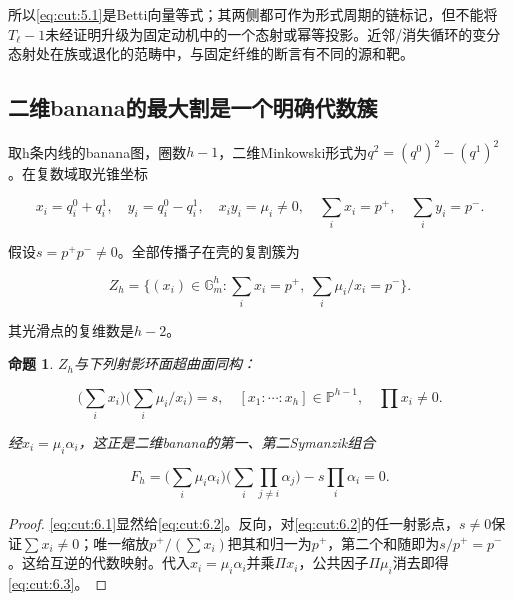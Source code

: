 \documentclass[11pt,a4paper,oneside]{ctexart}
\theoremstyle{cnplain}
\newtheorem{proposition}[theorem]{命题}
\theoremstyle{definition}
\theoremstyle{remark}
\numberwithin{equation}{section}
\begin{document}
所以\eqref{eq:cut:5.1}是Betti向量等式；其两侧都可作为形式周期的链标记，但不能将\(T_\ell - 1\)未经证明升级为固定动机中的一个态射或幂等投影。近邻/消失循环的变分态射处在族或退化的范畴中，与固定纤维的断言有不同的源和靶。


\subsection{二维banana的最大割是一个明确代数簇}\label{sec:cut:6}

取h条内线的banana图，圈数\(h- 1\)，二维Minkowski形式为\(q^{2}=(q^{0})^{2}- (q^{1})^{2}\)。在复数域取光锥坐标

\begin{equation}
x_i=q_i^0+q_i^1,\quad y_i=q_i^0-q_i^1,
 \quad x_iy_i=\mu_i\ne0,
 \quad\sum_i x_i=p^+,\quad\sum_i y_i=p^-.
\end{equation}

假设\(s=p^+p^-\ne 0\)。全部传播子在壳的复割簇为

\begin{equation}
Z_h=\{(x_i)\in\mathbb G_m^h:
             \sum_i x_i=p^+,\ \sum_i\mu_i/x_i=p^-\}.   \label{eq:cut:6.1}
\end{equation}

其光滑点的复维数是\(h- 2\)。

\begin{proposition}

\label{thm:cut:6.1} \(Z_h\)与下列射影环面超曲面同构：

\begin{equation}
\Big(\sum_i x_i\Big)\Big(\sum_i\mu_i/x_i\Big)=s,
 \quad[x_1:\cdots:x_h]\in\mathbb P^{h-1},\quad\prod x_i\ne0.
                                                               \label{eq:cut:6.2}
\end{equation}

经\(x_i=\mu _i\alpha _i\)，这正是二维banana的第一、第二Symanzik组合

\begin{equation}
F_h=\Big(\sum_i\mu_i\alpha_i\Big)
               \Big(\sum_i\prod_{j\ne i}\alpha_j\Big)
                      -s\prod_i\alpha_i=0.             \label{eq:cut:6.3}
\end{equation}

\end{proposition}

\begin{proof}

\eqref{eq:cut:6.1}显然给\eqref{eq:cut:6.2}。反向，对\eqref{eq:cut:6.2}的任一射影点，\(s\ne 0\)保证\(\sum x_i\ne 0\)；唯一缩放\(p^+/(\sum x_i)\)把其和归一为\(p^+\)，第二个和随即为\(s/p^+=p^-\)。这给互逆的代数映射。代入\(x_i=\mu _i\alpha _i\)并乘\(\Pi x_i\)，公共因子\(\Pi \mu _i\)消去即得\eqref{eq:cut:6.3}。

\end{proof}
\end{document}
